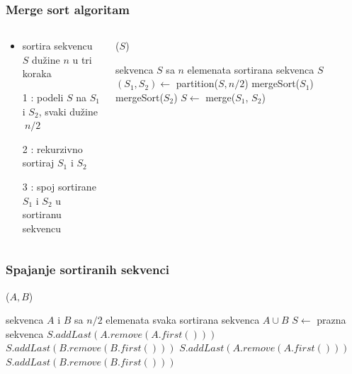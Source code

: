 \documentclass[compress]{beamer}
\begin{document}
\begin{frame}[fragile]
  \frametitle{Merge sort algoritam}
  \begin{columns}
    \begin{column}[t]{6cm}
      \begin{itemize}
        \item sortira sekvencu $S$ dužine $n$ u tri koraka
        \item[1] : podeli $S$ na $S_1$ i $S_2$, svaki dužine $~n/2$
        \item[2] : rekurzivno sortiraj $S_1$ i $S_2$
        \item[3] : spoj sortirane $S_1$ i $S_2$ u sortiranu sekvencu
      \end{itemize}    
    \end{column}
    \begin{column}[t]{6cm}
      ($S$)
      \begin{algorithmic}
      \REQUIRE sekvenca $S$ sa $n$ elemenata
      \ENSURE sortirana sekvenca $S$
        \STATE $(S_1, S_2) \leftarrow$ partition($S, n/2$)
        \STATE mergeSort($S_1$)
        \STATE mergeSort($S_2$)
        \STATE $S \leftarrow$ merge($S_1$, $S_2$)
      \ENDIF
      \end{algorithmic}    
    \end{column}
  \end{columns}
\end{frame}

\begin{frame}
  \frametitle{Spajanje sortiranih sekvenci}
  ($A, B$)
  \begin{algorithmic}
    \REQUIRE sekvenca $A$ i $B$ sa $n/2$ elemenata svaka
    \ENSURE sortirana sekvenca $A\cup B$
    \STATE $S \leftarrow$ prazna sekvenca
        \STATE $S.addLast(A.remove(A.first()))$
      \ELSE
        \STATE $S.addLast(B.remove(B.first()))$
      \ENDIF
    \ENDWHILE
      \STATE $S.addLast(A.remove(A.first()))$
    \ENDWHILE
      \STATE $S.addLast(B.remove(B.first()))$
    \ENDWHILE
  \end{algorithmic}    
\end{frame}
\end{document}
